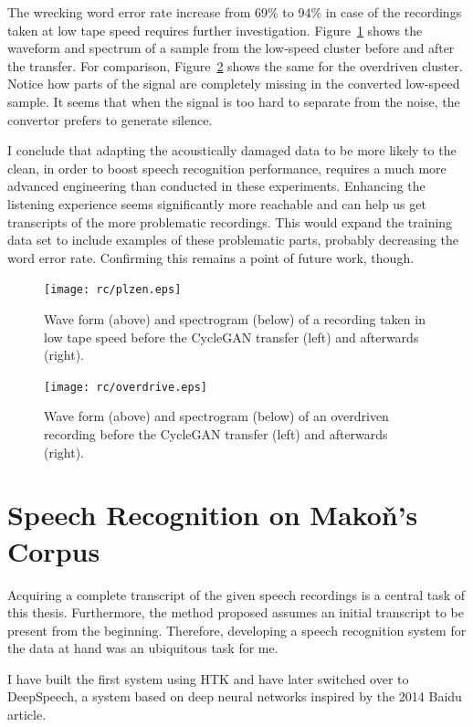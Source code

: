 \documentclass[12pt,a4paper]{report}
\begin{document}
The wrecking word error rate increase from 69\% to 94\% in case of the
recordings taken at low tape speed requires further investigation.
Figure~\ref{fig:plzen} shows the waveform and spectrum of a sample from the low-speed
cluster before and after the transfer. For comparison,
Figure~\ref{fig:overdrive} shows the same for the overdriven cluster.
Notice how parts of the signal are completely missing in the converted low-speed
sample. It seems that when the signal is too hard to separate from the noise,
the convertor prefers to generate silence.

I conclude that adapting the acoustically damaged data to be more likely to the
clean, in order to boost speech recognition performance, requires a much more
advanced engineering than conducted in these experiments. Enhancing the
listening experience seems significantly more reachable and can help us get
transcripts of the more problematic recordings. This would expand the training
data set to include examples of these problematic parts, probably decreasing the
word error rate. Confirming this remains a point of future work, though.

\begin{figure}[tpb]
\centering
\texttt{[image: rc/plzen.eps]}
\caption{Wave form (above) and spectrogram (below) of a recording taken in low
tape speed before the CycleGAN transfer (left) and afterwards (right).}
\label{fig:plzen}
\end{figure}

\begin{figure}[tpb]
\centering
\texttt{[image: rc/overdrive.eps]}
\caption{Wave form (above) and spectrogram (below) of an overdriven recording
before the CycleGAN transfer (left) and afterwards (right).}
\label{fig:overdrive}
\end{figure}

\chapter{Speech Recognition on Makoň's Corpus}
\label{chap:svolocz}

Acquiring a complete transcript of the given speech recordings is a central task
of this thesis. Furthermore, the method proposed assumes an initial transcript
to be present from the beginning. Therefore, developing a speech recognition
system for the data at hand was an ubiquitous task for me.

I have built the first system using HTK and have later switched over to
DeepSpeech, a system based on deep neural networks inspired by the 2014 Baidu
article\cite{hannun2014deep}.
\end{document}
